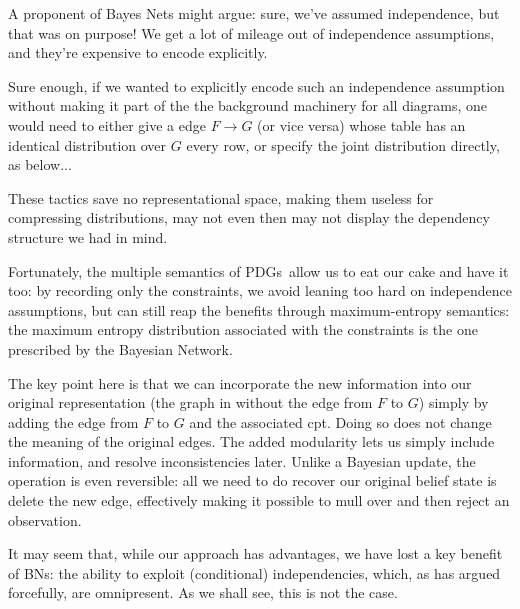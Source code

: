 \documentclass{article}
\newcommand{\MN}{PDG}
\newcommand{\MNs}{\MN s}
\numberwithin{equation}{section}
\begin{document}
\begin{notfocus}
\begin{example}
\begin{vfull}
{			A proponent of Bayes Nets might argue: sure, we've assumed independence, but that was on purpose! We get a lot of mileage out of independence assumptions, and they're expensive to encode explicitly.
			
			Sure enough, if we wanted to explicitly encode such an independence assumption without making it part of the the background machinery for all diagrams, one would need to either give a edge $F \to G$ (or vice versa) whose table has an identical distribution over $G$ every row, or specify the joint distribution directly, as below...
			
			\centerline{}
		
			These tactics save no representational space, making them useless for compressing distributions, may not even then may not display the dependency structure we had in mind. 
			
			Fortunately, the multiple semantics of \MNs\ allow us to eat our cake and have it too: by recording only the constraints, we avoid leaning too hard on independence assumptions, but can still reap the benefits through maximum-entropy semantics: the maximum entropy distribution associated with the constraints is the one prescribed by the Bayesian Network.
		}
		\end{vfull}
	
		The key point here is that we can incorporate the new information into
		our original representation (the graph in 
		without the edge from $F$ to $G$) simply  by adding the edge from $F$
		to $G$ and the associated cpt.  Doing so does not change the meaning
		of the original edges.  The added modularity lets us simply include
		information, and resolve inconsistencies later. Unlike a Bayesian
		update, the operation is even reversible: all we need to do recover
		our original belief state is delete the new edge, effectively making
		it possible to mull over and then reject an observation.
	\end{example}

	It may seem that, while our approach has advantages, we have lost a
	key benefit of BNs: the ability to exploit (conditional)
	independencies, which, as \textcite{pearl2014probabilistic} has argued
	forcefully, are omnipresent.  As we shall see, this is not the case.  
	


\end{notfocus}
\end{document}
